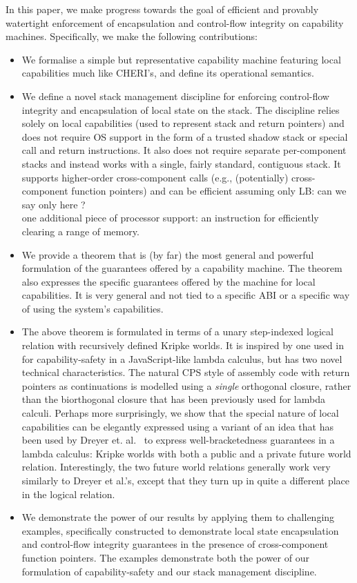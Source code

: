 \documentclass[compsoc,conference,letterpaper,fleqn]{IEEEtran}
\newcommand\lars[1]{{\color{purple} \sf \footnotesize {LB: #1}}\\}
\begin{document}
In this paper, we make progress towards the goal of efficient and provably
watertight enforcement of encapsulation and control-flow integrity on capability
machines.  Specifically, we make the following contributions:
\begin{itemize}
\item We formalise a simple but representative capability machine featuring
  local capabilities much like CHERI's, and define its operational semantics.
\item We define a novel stack management discipline for enforcing control-flow
  integrity and encapsulation of local state on the stack. The discipline relies
  solely on local capabilities (used to represent stack and return pointers) and
  does not require OS support in the form of a trusted shadow stack or special
  call and return instructions. It also does not require separate per-component
  stacks and instead works with a single, fairly standard, contiguous stack. It
  supports higher-order cross-component calls (e.g., (potentially)
  cross-component function pointers) and can be efficient assuming
  only \lars{can we say only here ?}
  one additional piece of processor support: an instruction for efficiently clearing
  a range of memory.
\item We provide a theorem that is (by far) the most general
  and powerful formulation of the guarantees offered by a capability machine.
  The theorem also expresses the specific guarantees offered by the machine for
  local capabilities. It is very general and not tied to a specific ABI or a
  specific way of using the system's capabilities.
\item The above theorem is formulated in terms of a unary step-indexed
  logical relation with recursively defined Kripke worlds. It is
  inspired by one used in \cite{Devriese:2016ObjCap} for
  capability-safety in a JavaScript-like lambda calculus, but has two
  novel technical characteristics. The natural CPS style of assembly
  code with return pointers as continuations is modelled using a
  \emph{single} orthogonal closure, rather than the biorthogonal
  closure that has been previously used for lambda calculi. Perhaps
  more surprisingly, we show that the special nature of local
  capabilities can be elegantly expressed using a variant of an idea
  that has been used by Dreyer et. al.~\cite{Dreyer:jfp12} to express
  well-bracketedness guarantees in a lambda calculus: Kripke worlds
  with both a public and a private future world relation. Interestingly,
  the two future world relations generally work very similarly to
  Dreyer et al.'s, except that they turn up in quite a different place
  in the logical relation.
\item We demonstrate the power of our results by applying them to challenging
  examples, specifically constructed to demonstrate local state encapsulation
  and control-flow integrity guarantees in the presence of cross-component
  function pointers. The examples demonstrate both the power of our formulation
  of capability-safety and our stack management discipline.
\end{itemize}
\end{document}
